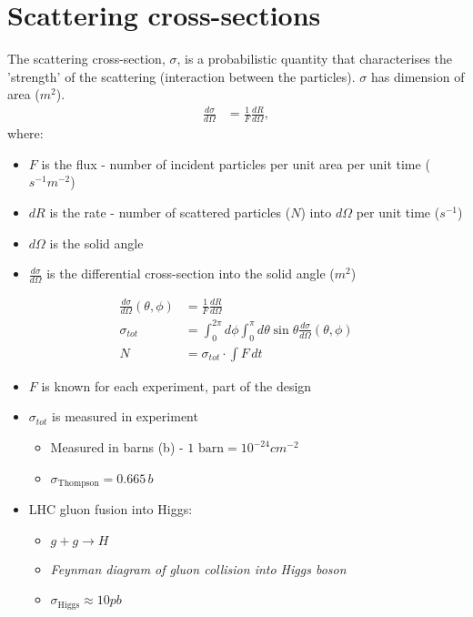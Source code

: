 \documentclass[a4paper, 11pt, normalem]{report}
\begin{document}
\section{Scattering cross-sections}
The scattering cross-section, $\sigma$, is a probabilistic quantity that characterises the 'strength' of the scattering (interaction between the particles).
$\sigma$ has dimension of area ($m^2$).
\begin{align}
    \frac{d\sigma}{d\Omega} &= \frac{1}{F} \frac{dR}{d\Omega},
\end{align}
where:
\begin{itemize}
    \item $F$ is the flux - number of incident particles per unit area per unit time ($s^{-1}m^{-2}$)
    \item $dR$ is the rate - number of scattered particles ($N$) into $d\Omega$ per unit time ($s^{-1}$)
    \item $d\Omega$ is the solid angle
    \item $\frac{d\sigma}{d\Omega}$ is the differential cross-section into the solid angle ($m^2$)
\end{itemize}
\begin{align}
    \frac{d\sigma}{d\Omega}(\theta,\phi) &= \frac{1}{F}\frac{dR}{d\Omega} \\
    \sigma_{tot} &= \int_0^{2\pi} d\phi \int_0^\pi d\theta \sin\theta \frac{d\sigma}{d\Omega}(\theta,\phi) \\
    N &= \sigma_{tot} \cdot \int F\,dt
\end{align}
\begin{itemize}
    \item $F$ is known for each experiment, part of the design
    \item $\sigma_{tot}$ is measured in experiment
        \begin{itemize}
            \item Measured in barns (b) - $1 \text{ barn} = 10^{-24} cm^{-2}$
            \item $\sigma_{\text{Thompson}} = 0.665\,b$
        \end{itemize}
    \item LHC gluon fusion into Higgs:
        \begin{itemize}
            \item $g+g \to H$
            \item \emph{Feynman diagram of gluon collision into Higgs boson}
            \item $\sigma_{\text{Higgs}} \approx 10 pb$
        \end{itemize}
\end{itemize}
\end{document}

